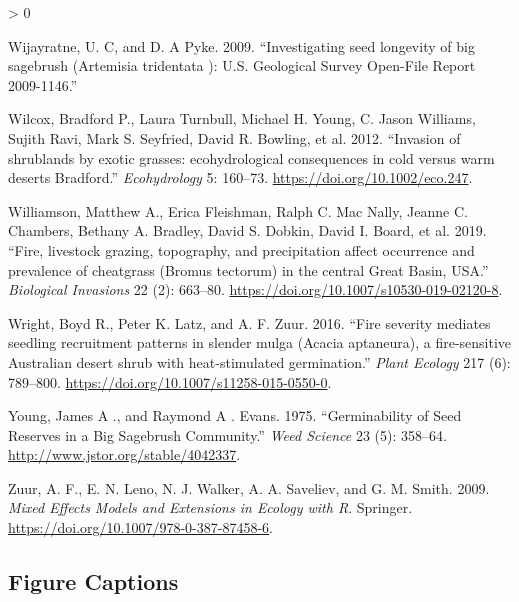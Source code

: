 \documentclass[
  12pt,
]{article}
\newlength{\cslhangindent}
\newenvironment{CSLReferences}[2] %
 {%
  \setlength{\parindent}{0pt}
  \ifodd #1 \everypar{\setlength{\hangindent}{\cslhangindent}}\ignorespaces\fi
  \ifnum #2 > 0
  \setlength{\parskip}{#2\baselineskip}
  \fi
 }%
 {}
\begin{document}
\begin{CSLReferences}{1}{0}
\leavevmode\hypertarget{ref-Wijayratne2009}{}%
Wijayratne, U. C, and D. A Pyke. 2009. {``{Investigating seed longevity
of big sagebrush (Artemisia tridentata ): U.S. Geological Survey
Open-File Report 2009-1146}.''}

\leavevmode\hypertarget{ref-Wilcox2012}{}%
Wilcox, Bradford P., Laura Turnbull, Michael H. Young, C. Jason
Williams, Sujith Ravi, Mark S. Seyfried, David R. Bowling, et al. 2012.
{``{Invasion of shrublands by exotic grasses: ecohydrological
consequences in cold versus warm deserts Bradford}.''}
\emph{Ecohydrology} 5: 160--73. \url{https://doi.org/10.1002/eco.247}.

\leavevmode\hypertarget{ref-Williamson2019}{}%
Williamson, Matthew A., Erica Fleishman, Ralph C. Mac Nally, Jeanne C.
Chambers, Bethany A. Bradley, David S. Dobkin, David I. Board, et al.
2019. {``{Fire, livestock grazing, topography, and precipitation affect
occurrence and prevalence of cheatgrass (Bromus tectorum) in the central
Great Basin, USA}.''} \emph{Biological Invasions} 22 (2): 663--80.
\url{https://doi.org/10.1007/s10530-019-02120-8}.

\leavevmode\hypertarget{ref-Wright2016}{}%
Wright, Boyd R., Peter K. Latz, and A. F. Zuur. 2016. {``{Fire severity
mediates seedling recruitment patterns in slender mulga (Acacia
aptaneura), a fire-sensitive Australian desert shrub with
heat-stimulated germination}.''} \emph{Plant Ecology} 217 (6): 789--800.
\url{https://doi.org/10.1007/s11258-015-0550-0}.

\leavevmode\hypertarget{ref-Young1975}{}%
Young, James A ., and Raymond A . Evans. 1975. {``{Germinability of Seed
Reserves in a Big Sagebrush Community}.''} \emph{Weed Science} 23 (5):
358--64. \url{http://www.jstor.org/stable/4042337}.

\leavevmode\hypertarget{ref-Zuur2009}{}%
Zuur, A. F., E. N. Leno, N. J. Walker, A. A. Saveliev, and G. M. Smith.
2009. \emph{{Mixed Effects Models and Extensions in Ecology with R}}.
Springer. \url{https://doi.org/10.1007/978-0-387-87458-6}.

\end{CSLReferences}

\newpage

\hypertarget{figure-captions}{%
\subsection{Figure Captions}\label{figure-captions}}
\end{document}
